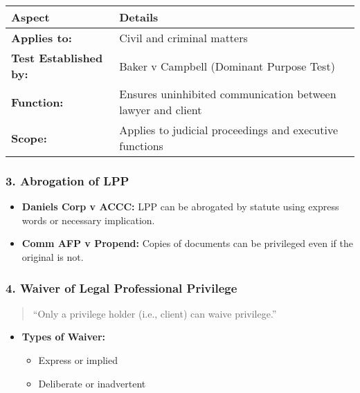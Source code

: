 \begin{longtable}[]{@{}
  >{\raggedright\arraybackslash}p{}
  >{\raggedright\arraybackslash}p{}@{}}
\toprule\noalign{}
\begin{minipage}[b]{\linewidth}\raggedright
\textbf{Aspect}
\end{minipage} & \begin{minipage}[b]{\linewidth}\raggedright
\textbf{Details}
\end{minipage} \\
\midrule\noalign{}
\endhead
\bottomrule\noalign{}
\endlastfoot
\textbf{Applies to:} & Civil and criminal matters \\
\textbf{Test Established by:} & Baker v Campbell (Dominant Purpose
Test) \\
\textbf{Function:} & Ensures uninhibited communication between lawyer
and client \\
\textbf{Scope:} & Applies to judicial proceedings and executive
functions \\
\end{longtable}

\subsubsection{\texorpdfstring{3. \textbf{Abrogation of
LPP}}{3. Abrogation of LPP}}\label{abrogation-of-lpp}

\begin{itemize}
\tightlist
\item
  \textbf{Daniels Corp v ACCC:} LPP can be abrogated by statute using
  express words or necessary implication.
\item
  \textbf{Comm AFP v Propend:} Copies of documents can be privileged
  even if the original is not.
\end{itemize}

\subsubsection{\texorpdfstring{4. \textbf{Waiver of Legal Professional
Privilege}}{4. Waiver of Legal Professional Privilege}}\label{waiver-of-legal-professional-privilege}

\begin{quote}
``Only a privilege holder (i.e., client) can waive privilege.''
\end{quote}

\begin{itemize}
\tightlist
\item
  \textbf{Types of Waiver:}

  \begin{itemize}
  \tightlist
  \item
    Express or implied
  \item
    Deliberate or inadvertent
  \end{itemize}
\end{itemize}

